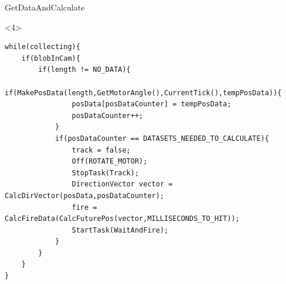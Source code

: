 \begin{frame}[fragile]{GetDataAndCalculate}
\begin{onlyenv}<4>
\begin{center}
\begin{minipage}[H]{0.9\linewidth}
\begin{lstlisting}
while(collecting){
	if(blobInCam){
        if(length != NO_DATA){
            if(MakePosData(length,GetMotorAngle(),CurrentTick(),tempPosData)){
            	posData[posDataCounter] = tempPosData;
                posDataCounter++;
            }
            if(posDataCounter == DATASETS_NEEDED_TO_CALCULATE){
				track = false;
                Off(ROTATE_MOTOR); 
                StopTask(Track);
                DirectionVector vector = CalcDirVector(posData,posDataCounter);
                fire = CalcFireData(CalcFuturePos(vector,MILLISECONDS_TO_HIT));
                StartTask(WaitAndFire);
            }
    	}
	}
}
\end{lstlisting} 
\end{minipage}
\end{center}
\end{onlyenv}
\end{frame}


